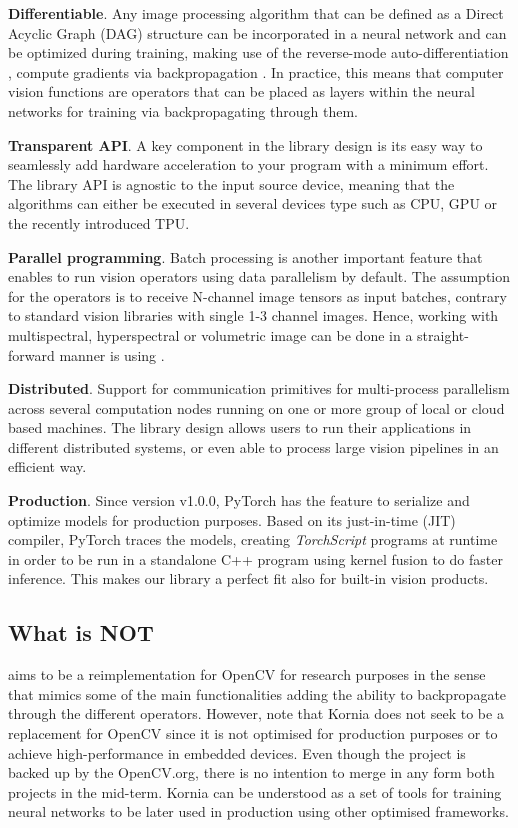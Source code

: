 \textbf{Differentiable}. Any image processing algorithm that can be defined as a Direct Acyclic Graph (DAG) structure can be incorporated in a neural network and can be optimized during training, making use of the reverse-mode \citep{Speelpenning1980CFP} auto-differentiation \citep{Griewank:2008:EDP:1455489}, compute gradients via backpropagation \citep{kelley1960gradient}. In practice, this means that computer vision functions are operators that can be placed as layers within the neural networks for training via backpropagating through them.

\textbf{Transparent API}. A key component in the library design is its easy way to seamlessly add hardware acceleration to your program with a minimum effort. The library API is agnostic to the input source device, meaning that the algorithms can either be executed in several devices type such as CPU, GPU or the recently introduced TPU.

\textbf{Parallel programming}. Batch processing is another important feature that enables to run vision operators using data parallelism by default. The assumption for the operators is to receive N-channel image tensors as input batches, contrary to standard vision libraries with single 1-3 channel images. Hence, working with multispectral, hyperspectral or volumetric image can be done in a straight-forward manner is using \lib{}.

\textbf{Distributed}. Support for communication primitives for multi-process parallelism across several computation nodes running on one or more group of local or cloud based machines. The library design allows users to run their applications in different distributed systems, or even able to process large vision pipelines in an efficient way.

\textbf{Production}. Since version v1.0.0, PyTorch has the feature to serialize and optimize models for production purposes. Based on its just-in-time (JIT) compiler, PyTorch traces the models, creating \textit{TorchScript} programs at runtime in order to be run in a standalone C++ program using kernel fusion to do faster inference. This makes our library a perfect fit also for built-in vision products.

\subsection*{What \lib \hspace{1px} is NOT}

\lib{} aims to be a reimplementation for OpenCV for research purposes in the sense that mimics some of the main functionalities adding the ability to backpropagate through the different operators. However, note that Kornia does not seek to be a replacement for OpenCV since it is not optimised for production purposes or to achieve  high-performance in embedded devices. Even though the project is backed up by the OpenCV.org, there is no intention to merge in any form both projects in the mid-term. Kornia can be understood as a set of tools for training neural networks to be later used in production using other optimised frameworks.

